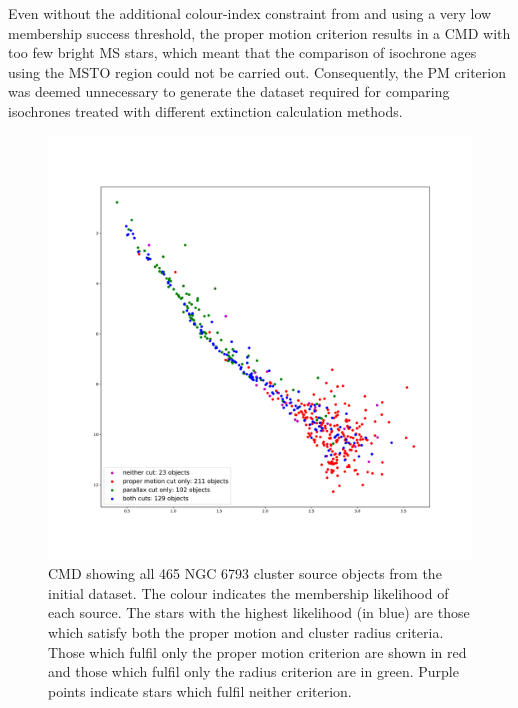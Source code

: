 \documentclass[12pt, a4paper]{report}
\begin{document}
Even without the additional colour-index constraint from \cite{2003ARep...47..263K} and using a very low membership success threshold, the proper motion criterion results in a CMD with too few bright MS stars, which meant that the comparison of isochrone ages using the MSTO region could not be carried out. Consequently, the PM criterion was deemed unnecessary to generate the dataset required for comparing isochrones treated with different extinction calculation methods.

\begin{figure}[h!]
\begin{center}
\includegraphics[width=1.0\textwidth]{../NGC6793_pm3sig_vs_plx_cuts_obs_cmd_schilbach.pdf}
\caption{CMD showing all 465 NGC 6793 cluster source objects from the initial dataset. The colour indicates the membership likelihood of each source. The stars with the highest likelihood (in blue) are those which satisfy both the proper motion and cluster radius criteria. Those which fulfil only the proper motion criterion are shown in red and those which fulfil only the radius criterion are in green. Purple points indicate stars which fulfil neither criterion.}
\label{NGC_6793_cut_effects}
\end{center}
\end{figure}
\end{document}
